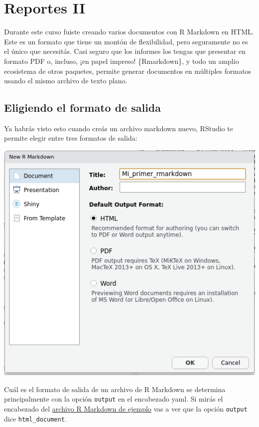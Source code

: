 \documentclass[
  openany]{book}
\begin{document}
\hypertarget{reportes-ii}{%
\chapter{Reportes II}\label{reportes-ii}}

Durante este curso fuiste creando varios documentos con R Markdown en HTML. Este es un formato que tiene un montón de flexibilidad, pero seguramente no es el único que necesitás. Casi seguro que los informes los tengas que presentar en formato PDF o, incluso, ¡en papel impreso! \{Rmarkdown\}, y todo un amplio ecosistema de otros paquetes, permite generar documentos en múltiples formatos usando el mismo archivo de texto plano.

\hypertarget{eligiendo-el-formato-de-salida}{%
\section{Eligiendo el formato de salida}\label{eligiendo-el-formato-de-salida}}

Ya habrás visto esto cuando creás un archivo markdown nuevo, RStudio te permite elegir entre tres formatos de salida:

\includegraphics{img/nuevo-rmd.png}

Cuál es el formato de salida de un archivo de R Markdown se determina principalmente con la opción \texttt{output} en el encabezado yaml. Si mirás el encabezado del \href{files/mi-primer-rmarkdown.Rmd}{archivo R Markdown de ejemplo} vas a ver que la opción \texttt{output} dice \texttt{html\_document}.
\end{document}

